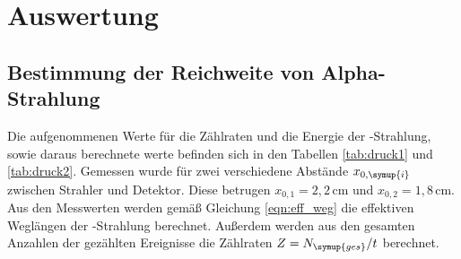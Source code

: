 \section{Auswertung}
\label{sec:Auswertung}

\subsection{Bestimmung der Reichweite von Alpha-Strahlung}
\label{subsec:reichweite}

Die aufgenommenen Werte für die Zählraten und die Energie der \alpha-Strahlung, sowie
daraus berechnete werte befinden sich in den Tabellen \ref{tab:druck1} und \ref{tab:druck2}.
Gemessen wurde für zwei verschiedene Abstände $x_{0,\symup{i}}$ zwischen Strahler und
Detektor. Diese betrugen $x_{0,1}=2{,}2\,$cm und $x_{0,2}=1{,}8\,$cm.
Aus den Messwerten werden gemäß Gleichung \eqref{eqn:eff_weg} die effektiven
Weglängen der \alpha-Strahlung berechnet. Außerdem werden aus den gesamten Anzahlen
der gezählten Ereignisse die Zählraten $Z=N_{\symup{ges}}/t$ berechnet.
